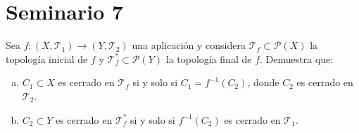 \section{Seminario 7}
\begin{ejer}
    [95] Sea $f : (X, \mathcal{T}_1) \to (Y, \mathcal{T}_2)$ una aplicación y considera $\mathcal{T}_f \subset \mathcal{P}(X)$ la topología inicial de $f$ y $\mathcal{T}_f^* \subset \mathcal{P}(Y)$ la topología final de $f$. Demuestra que:
    \begin{enumerate}[a)]
        \item $C_1 \subset X$ es cerrado en $\mathcal{T}_f$ si y solo si $C_1 = f^{-1}(C_2)$, donde $C_2$ es cerrado en $\mathcal{T}_2$.
        \item $C_2 \subset Y$ es cerrado en $\mathcal{T}_f^*$ si y solo si $f^{-1}(C_2)$ es cerrado en $\mathcal{T}_1$.
    \end{enumerate}
\end{ejer}
